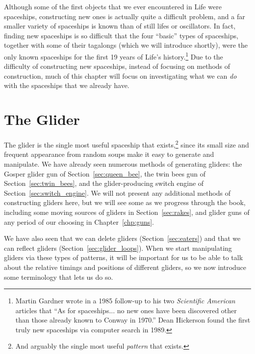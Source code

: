 Although some of the first objects that we ever encountered in Life were spaceships, constructing new ones is actually quite a difficult problem, and a far smaller variety of spaceships is known than of still lifes or oscillators. In fact, finding new spaceships is so difficult that the four ``basic'' types of spaceships, together with some of their tagalongs (which we will introduce shortly), were the only known spaceships for the first 19 years of Life's history.\footnote{Martin Gardner wrote in a 1985 follow-up to his two \emph{Scientific American} articles that ``As for spaceships... no new ones have been discovered other than those already known to Conway in 1970.''\cite{Gar83} Dean Hickerson found the first truly new spaceships via computer search in 1989.} Due to the difficulty of constructing new spaceships, instead of focusing on methods of construction, much of this chapter will focus on investigating what we can \emph{do} with the spaceships that we already have.



\section{The Glider}\label{sec:glider}

The glider is the single most useful spaceship that exists,\footnote{And arguably the single most useful \emph{pattern} that exists.} since its small size and frequent appearance from random soups make it easy to generate and manipulate. We have already seen numerous methods of generating gliders: the Gosper glider gun of Section~\ref{sec:queen_bee}, the twin bees gun of Section~\ref{sec:twin_bees}, and the glider-producing switch engine of Section~\ref{sec:switch_engine}. We will not present any additional methods of constructing gliders here, but we will see some as we progress through the book, including some moving sources of gliders in Section~\ref{sec:rakes}, and glider guns of any period of our choosing in Chapter~\ref{chp:guns}.

We have also seen that we can delete gliders (Section~\ref{sec:eaters}) and that we can reflect gliders (Section~\ref{sec:glider_loops}). When we start manipulating gliders via these types of patterns, it will be important for us to be able to talk about the relative timings and positions of different gliders, so we now introduce some terminology that lets us do so.


